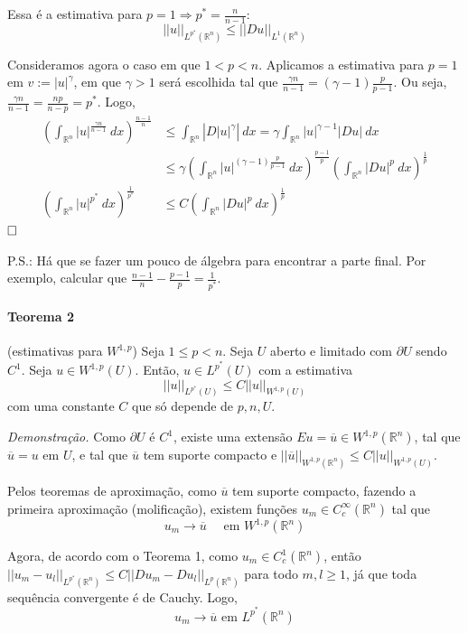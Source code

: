 \documentclass[11pt]{article}
\newcommand{\qed}{$\hfill\square$}
\newcommand{\Rn}{{\mathbb{R}^n}}
\newcommand{\nor}[2]{||#1||_{#2}}
\newcommand{\pu}{\partial U}
\begin{document}
Essa é a estimativa para $p=1 \Rightarrow p^* = \frac{n}{n-1}$: \[ ||u||_{L^{p^*}(\Rn)} \leq ||Du||_{L^1(\Rn)} \]



Consideramos agora o caso em que $ 1 < p < n $. Aplicamos a estimativa para $p=1$ em $v:= |u|^\gamma$, em que $\gamma>1$ será escolhida tal que $ \frac{\gamma n}{n-1} = (\gamma -1 ) \frac{p}{p-1} $. Ou seja, $ \frac{\gamma n}{n-1} = \frac{np}{n-p} = p^*$. Logo, \begin{align*}
	\left(\int_\Rn |u|^{\frac{\gamma n}{n-1}}\ dx \right)^{\frac{n-1}{n}} &\leq \int_\Rn \left| D|u|^\gamma \right|\ dx = \gamma \int_\Rn |u|^{\gamma -1} |Du|\ dx \\
	&\leq \gamma \left(  \int_\Rn |u|^{(\gamma -1) \frac{p}{p-1}}\ dx \right)^{\frac{p-1}{p}} \left( \int_\Rn |Du|^p\ dx \right)^{\frac{1}{p}} \\
	\left(\int_\Rn |u|^{p^*}\ dx \right)^{\frac{1}{p^*}} &\leq C \left( \int_\Rn |Du|^p\ dx \right)^{\frac{1}{p}}
\end{align*}\qed


P.S.: Há que se fazer um pouco de álgebra para encontrar a parte final. Por exemplo, calcular que $ \frac{n-1}{n} - \frac{p-1}{p} = \frac{1}{p^*}$.



\paragraph{Teorema 2}\label{t:sobolev-ineq-t2}(estimativas para \( W^{1,p} \)) Seja \( 1\leq p < n \). Seja \(U\) aberto e limitado com \(\partial U\) sendo \(C^1\). Seja \(u \in W^{1,p}(U)\). Então, \(u \in L^{p^*}(U)\) com a estimativa \[ ||u||_{L^{p^*}(U)} \leq C ||u||_{W^{1,p}(U)} \] com uma constante \(C\) que só depende de \(p, n, U\).

\textit{Demonstração.} Como $\pu$ é $C^1$, existe uma extensão $Eu=\overline{u} \in W^{1,p}(\Rn)$, tal que $\overline{u}=u \text{ em } U$, e tal que $\overline{u}$ tem suporte compacto e $ \nor{\overline{u}}{W^{1,p}(\Rn)} \leq C \nor{u}{W^{1,p}(U)} $.

Pelos teoremas de aproximação, como $\overline{u}$ tem suporte compacto, fazendo a primeira aproximação (molificação), existem funções $ u_m \in C^\infty_c(\Rn) $ tal que \[ u_m \rightarrow \overline{u} \quad \text{ em } W^{1,p}(\Rn) \]

Agora, de acordo com o Teorema 1, como $u_m \in C^1_c(\Rn)$, então $ ||u_m - u_l||_{L^{p^*}(\Rn)} \leq C ||Du_m  - Du_l||_{L^p(\Rn)} $ para todo $m,l \geq 1$, já que toda sequência convergente é de Cauchy. Logo, \[ u_m \rightarrow \overline{u} \text{ em } L^{p^*}(\Rn) \]
\end{document}
